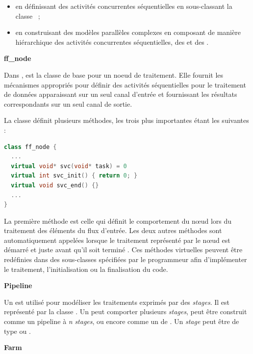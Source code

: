 \begin{itemize}
\item en d\'efinissant des activit\'es concurrentes s\'equentielles en sous-classant la classe ~;
 
\item en construisant des mod\`eles parall\`eles complexes en composant de mani\`ere hi\'erarchique des activit\'es concurrentes s\'equentielles, des  et des .
\end{itemize}

\textbf{ff\_node}

Dans ,  est la classe de base pour un noeud de traitement. Elle fournit les m\'ecanismes appropri\'es pour d\'efinir des activit\'es s\'equentielles pour le traitement de données apparaissant sur un seul canal d'entr\'ee et fournissant les r\'esultats correspondants sur un seul canal de sortie. 

La classe  d\'efinit plusieurs m\'ethodes, les trois plus importantes \'etant les suivantes :
\begin{lstlisting}[language=c++]
class ff_node {
  ...
  virtual void* svc(void* task) = 0
  virtual int svc_init() { return 0; } 
  virtual void svc_end() {} 
  ...
}
\end{lstlisting}

La premi\`ere m\'ethode est celle qui d\'efinit le comportement du nœud lors du traitement des \'el\'ements du flux d'entr\'ee. Les deux autres m\'ethodes sont automatiquement appel\'ees lorsque le traitement repr\'esent\'e par le nœud est d\'emarr\'e  et juste avant qu'il soit termin\'e . Ces m\'ethodes virtuelles peuvent \^etre red\'efinies dans des sous-classes  sp\'ecifi\'ees par le programmeur afin d'impl\'ementer le traitement, l'initialisation ou la finalisation du code.


\textbf{Pipeline}

Un  est utilis\'e pour mod\'eliser les traitements exprim\'es par des \emph{stages}. Il est repr\'esent\'e par la classe . Un  peut comporter plusieurs \emph{stages}, peut \^etre construit comme un pipeline \`a \emph{n} \emph{stages}, ou encore comme un  de . Un \emph{stage} peut \^etre de type  ou .


\goodbreak

\textbf{Farm}
\label{farm.sect}

